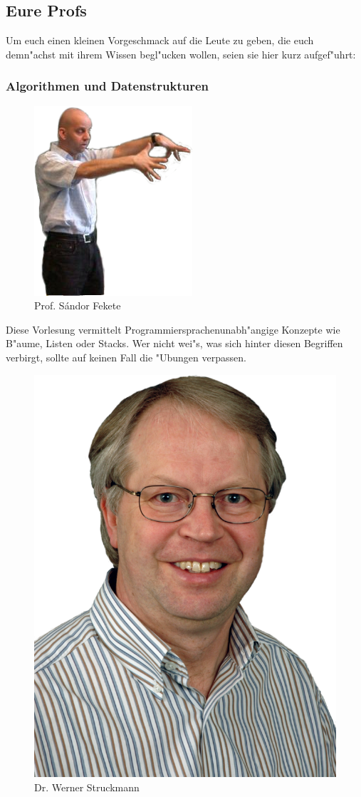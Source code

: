 \subsection{Eure Profs}
Um euch einen kleinen Vorgeschmack auf die Leute zu geben, die euch demn"achst mit ihrem Wissen begl"ucken wollen, seien sie hier kurz aufgef"uhrt:
\subsubsection{Algorithmen und Datenstrukturen}

\begin{figure}[h]
	\centering\includegraphics[width=0.7\linewidth]{bilder/dozenten/fekete_frei.png}\\
	{Prof. S\'andor Fekete}
\end{figure}
Diese Vorlesung vermittelt Programmiersprachenunabh"angige Konzepte wie B"aume, Listen oder Stacks. Wer nicht wei"s, was sich hinter diesen Begriffen verbirgt, sollte auf keinen Fall die "Ubungen verpassen.

\begin{figure}[h]
	\centering\includegraphics[width=0.6\linewidth]{bilder/dozenten/struck.png}\\
	{Dr. Werner Struckmann}
\end{figure}
